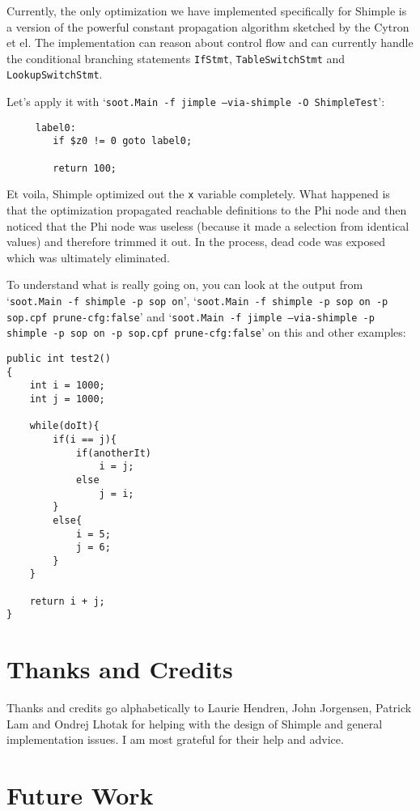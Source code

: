 \documentclass[10pt,letterpaper,oneside,onecolumn]{article}
\begin{document}
Currently, the only optimization we have implemented specifically for
Shimple is a version of the powerful constant propagation algorithm
sketched by the Cytron et el.  The implementation can reason about
control flow and can currently handle the conditional branching
statements {\tt IfStmt}, {\tt TableSwitchStmt} and {\tt
LookupSwitchStmt}.

Let's apply it with `{\tt soot.Main -f jimple --via-shimple -O
ShimpleTest}':

\begin{verbatim}
     label0:
        if $z0 != 0 goto label0;

        return 100;
\end{verbatim}

Et voila, Shimple optimized out the {\tt x} variable completely. What
happened is that the optimization propagated reachable definitions to
the Phi node and then noticed that the Phi node was useless (because
it made a selection from identical values) and therefore trimmed it
out.  In the process, dead code was exposed which was ultimately
eliminated.

To understand what is really going on, you can look at the output from
`{\tt soot.Main -f shimple -p sop on}', `{\tt soot.Main -f shimple -p sop
on -p sop.cpf prune-cfg:false}' and `{\tt soot.Main -f jimple
--via-shimple -p shimple -p sop on -p sop.cpf
prune-cfg:false}' on this and other examples:

\begin{verbatim}
public int test2()
{
    int i = 1000;
    int j = 1000;

    while(doIt){
        if(i == j){
            if(anotherIt)
                i = j;
            else
                j = i;
        }
        else{
            i = 5;
            j = 6;
        }
    }

    return i + j;
}
\end{verbatim}

\section{Thanks and Credits}

Thanks and credits go alphabetically to Laurie Hendren, John
Jorgensen, Patrick Lam and Ondrej Lhotak for helping with the design
of Shimple and general implementation issues.  I am most grateful for
their help and advice.

\section{Future Work}
\end{document}
